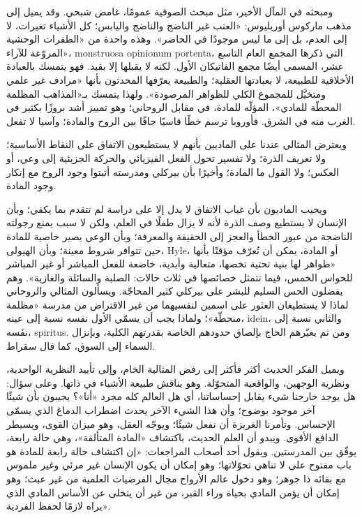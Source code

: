 ومبحثه في المآل الأخير، مثل مبحث الصوفية عمومًا، غامض شبحي. وقد يميل إلى مذهب ماركوس أوريليوس: «العنب غير الناضج والناضج واليابس؛ كل الأشياء تغيرات، لا إلى العدم، بل إلى ما ليس موجودًا في الحاضر». وهذه واحدة من «الطفرات الوحشية المروّعة للآراء»، \textenglish{monstruosa opinionum portenta}، التي ذكرها المجمع العام التاسع عشر، المسمى أيضًا مجمع الفاتيكان الأول. لكنه لا يقبلها إلا بقيد. فهو يتمسك بالعبادة الأخلاقية للطبيعة، لا بعبادتها العقلية؛ والطبيعة يعرّفها المحدثون بأنها «مرادف غير علمي ومتخيَّل للمجموع الكلي للظواهر المرصودة». ولهذا يتمسك بـ«المذاهب المظلمة المحطّة للمادي»، المؤلّه للمادة، في مقابل الروحاني؛ وهو تمييز أشد بروزًا بكثير في الغرب منه في الشرق. فأوروبا ترسم خطًا قاسيًا جافًا بين الروح والمادة؛ وآسيا لا تفعل.

ويعترض المثالي عندنا على الماديين بأنهم لا يستطيعون الاتفاق على النقاط الأساسية؛ ولا تعريف الذرة؛ ولا تفسير تحول الفعل الفيزيائي والحركة الجزيئية إلى وعي، أو العكس؛ ولا القول ما المادة؛ وأخيرًا بأن بيركلي ومدرسته أثبتوا وجود الروح مع إنكار وجود المادة.

ويجيب الماديون بأن غياب الاتفاق لا يدل إلا على دراسة لم تتقدم بما يكفي؛ وبأن الإنسان لا يستطيع وصف الذرة لأنه لا يزال طفلًا في العلم، ولكن لا سبب يمنع رجولته الناضجة من عبور الخطأ والعجز إلى الحقيقة والمعرفة؛ وبأن الوعي يصير خاصية للمادة حين تتوافر شروط معينة؛ وبأن الهيولى، \textenglish{Hyle}، أو المادة، يمكن أن تُعرّف مؤقتًا بأنها «ظواهر لها بنية تحتية تخصها، متعالية وأبدية، خاضعة للفعل المباشر أو غير المباشر للحواس الخمس، فيما تتمثل خصائصها في ثلاث حالات: الصلبة والسائلة والغازية». وهم يفضلون الحس السليم للبشر على بيركلي كثير المحاجّة. ويسألون المثالي والروحاني لماذا لا يستطيعان العثور على اسمين لنفسيهما من غير الاقتراض من مدرسة «مظلمة منحطّة»؛ ولماذا يجب أن يسمّي الأول نفسه نسبة إلى عينه، \textenglish{idein}، والثاني نسبة إلى نفَسه، \textenglish{spiritus}. ومن ثم يعيّرهم الحاج بإلصاق حدودهم الخاصة بقدرتهم الكلية، وبإنزال السماء إلى السوق، كما قال سقراط.

ويميل الفكر الحديث أكثر فأكثر إلى رفض المثالية الخام، وإلى تأييد النظرية الواحدية، ونظرية الوجهين، والواقعية المتحوّلة. وهو يناقش طبيعة الأشياء في ذاتها. وعلى سؤال: هل يوجد خارجنا شيء يقابل إحساساتنا، أي هل العالم كله مجرد «أنا»؟ يجيبون بأن شيئًا آخر موجود بوضوح؛ وأن هذا الشيء الآخر يحدث اضطراب الدماغ الذي يسمّى الإحساس. وتأمرنا الغريزة أن نفعل شيئًا؛ ويوجّه العقل، وهو ميزان القوى، ويسيطر الدافع الأقوى. ويبدو أن العلم الحديث، باكتشاف «المادة المتألقة»، وهي حالة رابعة، يوفّق بين المدرستين. ويقول أحد أصحاب المراجعات: «إن اكتشاف حالة رابعة للمادة هو باب مفتوح على لا تناهي تحوّلاتها؛ وهو إمكان أن يكون الإنسان غير مرئي وغير ملموس مع بقائه ذا جوهر؛ وهو دخول عالم الأرواح مجال الفرضيات العلمية من غير عبث؛ وهو إمكان أن يؤمن المادي بحياة وراء القبر، من غير أن يتخلى عن الأساس المادي الذي يراه لازمًا لحفظ الفردية».

